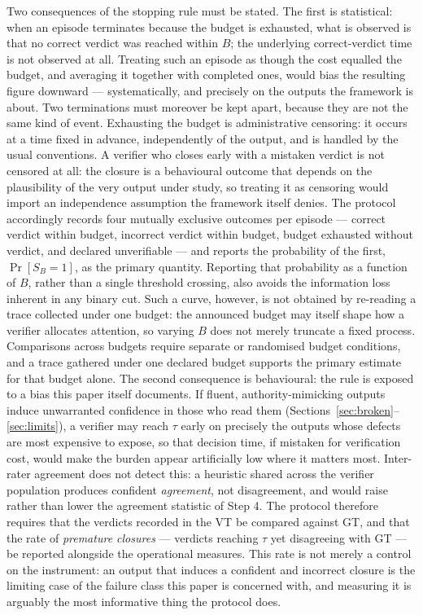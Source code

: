 \documentclass[11pt]{article}
\newcommand{\viola}[1]{\textcolor[HTML]{7030A0}{#1}}
\newcommand{\viola}[1]{#1}
\begin{document}
\begin{itemize}
    \viola{Two consequences of the stopping rule must be stated. The first is statistical: when an episode terminates because the budget is exhausted, what is observed is that no correct verdict was reached within $B$; the underlying correct-verdict time is not observed at all. Treating such an episode as though the cost equalled the budget, and averaging it together with completed ones, would bias the resulting figure downward --- systematically, and precisely on the outputs the framework is about. Two terminations must moreover be kept apart, because they are not the same kind of event. Exhausting the budget is administrative censoring: it occurs at a time fixed in advance, independently of the output, and is handled by the usual conventions. A verifier who closes early with a mistaken verdict is not censored at all: the closure is a behavioural outcome that depends on the plausibility of the very output under study, so treating it as censoring would import an independence assumption the framework itself denies. The protocol accordingly records four mutually exclusive outcomes per episode --- correct verdict within budget, incorrect verdict within budget, budget exhausted without verdict, and declared unverifiable --- and reports the probability of the first, \mbox{$\Pr[S_B=1]$}, as the primary quantity. \viola{Reporting that probability as a function of $B$, rather than a single threshold crossing, also avoids the information loss inherent in any binary cut. Such a curve, however, is not obtained by re-reading a trace collected under one budget: the announced budget may itself shape how a verifier allocates attention, so varying $B$ does not merely truncate a fixed process. Comparisons across budgets require separate or randomised budget conditions, and a trace gathered under one declared budget supports the primary estimate for that budget alone.} The second consequence is behavioural: the rule is exposed to a bias this paper itself documents. If fluent, authority-mimicking outputs induce unwarranted confidence in those who read them (Sections~\ref{sec:broken}--\ref{sec:limits}), a verifier may reach $\tau$ early on precisely the outputs whose defects are most expensive to expose, so that decision time, if mistaken for verification cost, would make the burden appear artificially low where it matters most. Inter-rater agreement does not detect this: a heuristic shared across the verifier population produces confident \emph{agreement}, not disagreement, and would raise rather than lower the agreement statistic of Step 4. The protocol therefore requires that the verdicts recorded in the VT be compared against GT, and that the rate of \emph{premature closures} --- verdicts reaching $\tau$ yet disagreeing with GT --- be \viola{reported alongside the operational measures}. This rate is not merely a control on the instrument: an output that induces a confident and incorrect closure is the limiting case of the failure class this paper is concerned with, and measuring it is arguably the most informative thing the protocol does.}


\end{itemize}
\end{document}
